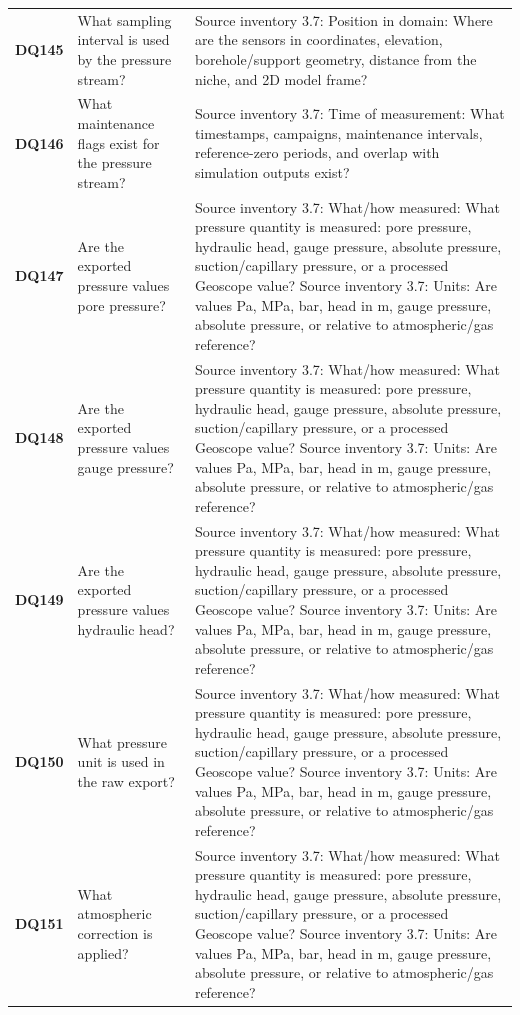 \begin{longtable}{@{}L{0.09\textwidth} L{0.31\textwidth} L{0.52\textwidth}@{}}
\addlinespace[0.18em]
\textbf{DQ145} & What sampling interval is used by the pressure stream? & Source inventory 3.7: Position in domain: Where are the sensors in coordinates, elevation, borehole/support geometry, distance from the niche, and 2D model frame?\\
\addlinespace[0.18em]
\textbf{DQ146} & What maintenance flags exist for the pressure stream? & Source inventory 3.7: Time of measurement: What timestamps, campaigns, maintenance intervals, reference-zero periods, and overlap with simulation outputs exist?\\
\addlinespace[0.18em]
\textbf{DQ147} & Are the exported pressure values pore pressure? & Source inventory 3.7: What/how measured: What pressure quantity is measured: pore pressure, hydraulic head, gauge pressure, absolute pressure, suction/capillary pressure, or a processed Geoscope value? Source inventory 3.7: Units: Are values Pa, MPa, bar, head in m, gauge pressure, absolute pressure, or relative to atmospheric/gas reference?\\
\addlinespace[0.18em]
\textbf{DQ148} & Are the exported pressure values gauge pressure? & Source inventory 3.7: What/how measured: What pressure quantity is measured: pore pressure, hydraulic head, gauge pressure, absolute pressure, suction/capillary pressure, or a processed Geoscope value? Source inventory 3.7: Units: Are values Pa, MPa, bar, head in m, gauge pressure, absolute pressure, or relative to atmospheric/gas reference?\\
\addlinespace[0.18em]
\textbf{DQ149} & Are the exported pressure values hydraulic head? & Source inventory 3.7: What/how measured: What pressure quantity is measured: pore pressure, hydraulic head, gauge pressure, absolute pressure, suction/capillary pressure, or a processed Geoscope value? Source inventory 3.7: Units: Are values Pa, MPa, bar, head in m, gauge pressure, absolute pressure, or relative to atmospheric/gas reference?\\
\addlinespace[0.18em]
\textbf{DQ150} & What pressure unit is used in the raw export? & Source inventory 3.7: What/how measured: What pressure quantity is measured: pore pressure, hydraulic head, gauge pressure, absolute pressure, suction/capillary pressure, or a processed Geoscope value? Source inventory 3.7: Units: Are values Pa, MPa, bar, head in m, gauge pressure, absolute pressure, or relative to atmospheric/gas reference?\\
\addlinespace[0.18em]
\textbf{DQ151} & What atmospheric correction is applied? & Source inventory 3.7: What/how measured: What pressure quantity is measured: pore pressure, hydraulic head, gauge pressure, absolute pressure, suction/capillary pressure, or a processed Geoscope value? Source inventory 3.7: Units: Are values Pa, MPa, bar, head in m, gauge pressure, absolute pressure, or relative to atmospheric/gas reference?\\

\end{longtable}
